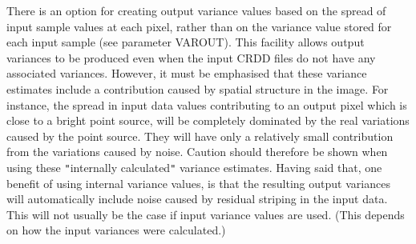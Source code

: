\documentclass[11pt,nolof,noabs]{starlink}
\begin{document}
\begin{small}
{{      There is an option for creating output variance values based on
      the spread of input sample values at each pixel, rather than on
      the variance value stored for each input sample (see parameter
      VAROUT).  This facility allows output variances to be produced
      even when the input CRDD files do not have any associated
      variances. However, it must be emphasised that these variance
      estimates include a contribution caused by spatial structure in
      the image. For instance, the spread in input data values
      contributing to an output pixel which is close to a bright point
      source, will be completely dominated by the real variations
      caused by the point source. They will have only a relatively
      small contribution from the variations caused by noise. Caution
      should therefore be shown when using these \texttt{"}internally
      calculated\texttt{"} variance estimates.  Having said that, one benefit of
      using internal variance values, is that the resulting output
      variances will automatically include noise caused by residual
      striping in the input data. This will not usually be the case if
      input variance values are used. (This depends on how the input
      variances were calculated.)
   }
}


\end{small}
\end{document}
